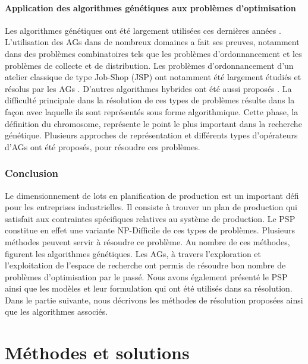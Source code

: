 \documentclass[12pt,a4paper]{article}
\begin{document}
	\subsection{Application des algorithmes génétiques aux problèmes d'optimisation}
	
	Les algorithmes génétiques ont été largement utilisées ces dernières années \cite{jawahar}. L’utilisation des AGs dans de nombreux domaines a fait ses preuves, notamment dans des problèmes combinatoires tels que les problèmes d’ordonnancement \cite{davis} et les problèmes de collecte et de distribution. Les problèmes d’ordonnancement d’un atelier classique de type Job-Shop (JSP) ont notamment été largement étudiés et résolus par les AGs \cite{boukef}. D’autres algorithmes hybrides ont été aussi proposés \cite{cavalieri}. La difficulté principale dans la résolution de ces types de problèmes résulte dans la façon avec laquelle ils sont représentés sous forme algorithmique. Cette phase, la définition du chromosome, représente le point le plus important dans la recherche génétique. Plusieurs approches de représentation et différents types d’opérateurs d’AGs ont été proposés, pour résoudre ces problèmes.
	
	\section*{Conclusion}
	Le dimensionnement de lots en planification de production est un important défi pour les entreprises industrielles. Il consiste à trouver un plan de production qui satisfait aux contraintes spécifiques relatives au système de production. Le PSP constitue en effet une variante NP-Difficile de ces types de problèmes. Plusieurs méthodes peuvent servir à résoudre ce problème. Au nombre de ces méthodes, figurent les algorithmes génétiques. Les AGs, à travers l'exploration et l'exploitation de l'espace de recherche ont permis de résoudre bon nombre de problèmes d'optimisation par le passé. Nous avons également présenté le PSP ainsi que les modèles et leur formulation qui ont été utilisés dans sa résolution.	Dans le partie suivante, nous décrivons les méthodes de résolution proposées ainsi que les algorithmes associés.	
		
	\newpage
	
	\part{Méthodes et solutions}
	\setcounter{section}{0}
	
\end{document}

